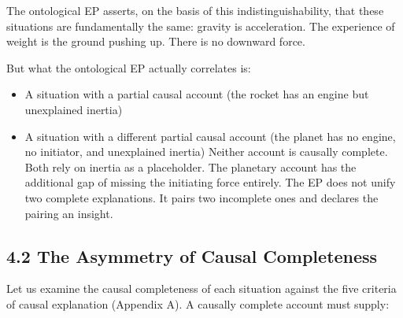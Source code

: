 \documentclass[11pt]{article}
\providecommand{\tightlist}{\setlength{\itemsep}{0pt}\setlength{\parskip}{0pt}}
\begin{document}
The ontological EP asserts, on the basis of this indistinguishability, that these situations are fundamentally the same: gravity is acceleration. The experience of weight is the ground pushing up. There is no downward force.

But what the ontological EP actually correlates is:

\begin{itemize}
\tightlist
\item
  A situation with a partial causal account (the rocket has an engine but unexplained inertia)
\item
  A situation with a different partial causal account (the planet has no engine, no initiator, and unexplained inertia) Neither account is causally complete. Both rely on inertia as a placeholder. The planetary account has the additional gap of missing the initiating force entirely. The EP does not unify two complete explanations. It pairs two incomplete ones and declares the pairing an insight.
\end{itemize}

\subsection{4.2 The Asymmetry of Causal Completeness}

Let us examine the causal completeness of each situation against the five criteria of causal explanation (Appendix A). A causally complete account must supply:
\end{document}
